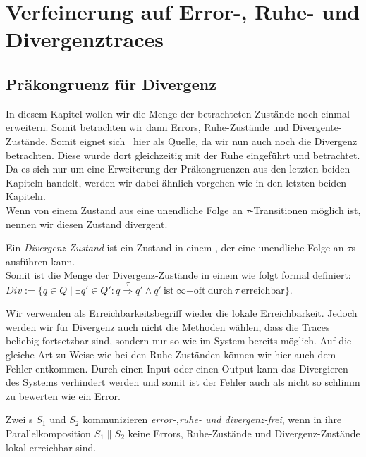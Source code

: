 \chapter{Verfeinerung auf Error-, Ruhe- und Divergenztraces}

\section{Präkongruenz für Divergenz}

In diesem Kapitel wollen wir die Menge der betrachteten Zustände noch einmal
erweitern. Somit betrachten wir dann Errors, Ruhe-Zustände und
Divergente-Zustände. Somit eignet sich~\cite{Chilton2013} hier als Quelle, da
wir nun auch noch die Divergenz betrachten. Diese wurde dort gleichzeitig mit
der Ruhe eingeführt und betrachtet. Da es sich nur um eine Erweiterung der
Präkongruenzen aus den letzten beiden Kapiteln handelt, werden wir dabei
ähnlich vorgehen wie in den letzten beiden Kapiteln.\\
Wenn von einem Zustand aus eine unendliche Folge an $\tau$-Transitionen möglich
ist, nennen wir diesen Zustand divergent.

\begin{Def}[Divergenz]
  Ein \emph{Divergenz-Zustand} ist ein Zustand in einem \EIO{}, der eine
  unendliche Folge an $\tau$s ausführen kann.\\
  Somit ist die Menge der Divergenz-Zustände in einem \EIO{} wie folgt formal
  definiert: $Div := \{q\in Q\mid \exists q'\in Q': q
  \overset{\tau}{\Rightarrow} q' \wedge q'~\mathrm{ist}~\infty\mathrm{-oft}
  ~\mathrm{durch}~\tau ~\mathrm{erreichbar}\}$.
\end{Def}

Wir verwenden als Erreichbarkeitsbegriff wieder die lokale Erreichbarkeit.
Jedoch werden wir für Divergenz auch nicht die Methoden wählen, dass die Traces
beliebig fortsetzbar sind, sondern nur so wie im System bereits möglich. Auf
die gleiche Art zu Weise wie bei den Ruhe-Zuständen können wir hier auch dem
Fehler entkommen. Durch einen Input oder einen Output kann das Divergieren des
Systems verhindert werden und somit ist der Fehler auch als nicht so
\glqq{}schlimm\grqq{} zu bewerten wie ein Error.

\begin{Def}
  Zwei \EIO{}s $S_1$ und $S_2$ kommunizieren \emph{error-,ruhe- und
  divergenz-frei}, wenn in ihre Parallelkomposition $S_1\|S_2$ keine Errors,
  Ruhe-Zustände und Divergenz-Zustände lokal erreichbar sind.
\end{Def}

